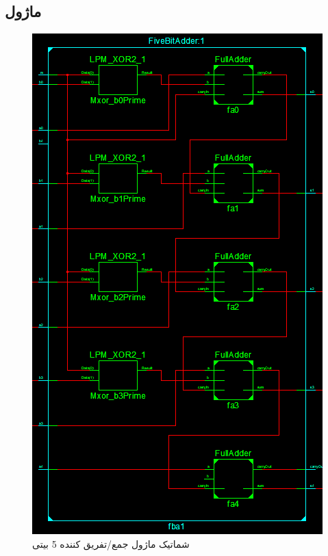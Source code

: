 \documentclass[fleqn]{article}
\begin{document}
\subsection{ماژول }
\begin{figure}[H]
	\centering
	\includegraphics[width=.5\paperwidth]{./Schematic/FBA.png}
	\caption{شماتیک ماژول جمع/تفریق کننده 5 بیتی}
	\label{fba}
\end{figure}
\end{document}

